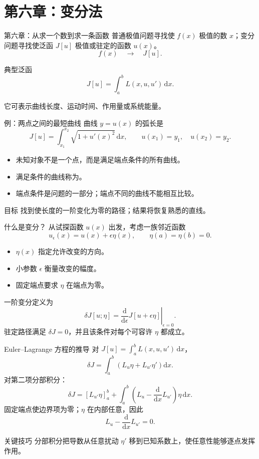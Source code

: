 \section{第六章：变分法}

\begin{frame}{第六章：从求一个数到求一条函数}
  普通极值问题寻找使 $f(x)$ 极值的数 $x$；变分问题寻找使泛函 $J[u]$ 极值或驻定的函数 $u(x)$。
  \[
    f(x)\quad\longrightarrow\quad J[u].
  \]
  \begin{block}{典型泛函}
    \[
      J[u]=\int_a^bL(x,u,u')\,\mathrm{d}x.
    \]
  \end{block}
  它可表示曲线长度、运动时间、作用量或系统能量。
\end{frame}

\begin{frame}{例：两点之间的最短曲线}
  曲线 $y=u(x)$ 的弧长是
  \[
    J[u]=\int_{x_1}^{x_2}\sqrt{1+u'(x)^2}\,\mathrm{d}x,
    \qquad u(x_1)=y_1,\quad u(x_2)=y_2.
  \]
  \begin{itemize}
    \item 未知对象不是一个点，而是满足端点条件的所有曲线。
    \item 满足条件的曲线称为。
    \item 端点条件是问题的一部分；端点不同的曲线不能相互比较。
  \end{itemize}
  \begin{alertblock}{目标}
    找到使长度的一阶变化为零的路径；结果将恢复熟悉的直线。
  \end{alertblock}
\end{frame}

\begin{frame}{什么是变分？}
  从试探函数 $u(x)$ 出发，考虑一族邻近函数
  \[
    u_\epsilon(x)=u(x)+\epsilon\eta(x),
    \qquad \eta(a)=\eta(b)=0.
  \]
  \begin{itemize}
    \item $\eta(x)$ 指定允许改变的方向。
    \item 小参数 $\epsilon$ 衡量改变的幅度。
    \item 固定端点要求 $\eta$ 在端点为零。
  \end{itemize}
  一阶变分定义为
  \[
    \delta J[u;\eta]=
    \left.\frac{\mathrm{d}}{\mathrm{d}\epsilon}J[u+\epsilon\eta]
    \right|_{\epsilon=0}.
  \]
  驻定路径满足 $\delta J=0$，并且该条件对每个可容许 $\eta$ 都成立。
\end{frame}

\begin{frame}{Euler--Lagrange 方程的推导}
  对 $J[u]=\int_a^bL(x,u,u')\,\mathrm{d}x$，
  \[
    \delta J=\int_a^b\left(L_u\eta+L_{u'}\eta'\right)\mathrm{d}x.
  \]
  对第二项分部积分：
  \[
    \delta J=\left[L_{u'}\eta\right]_a^b+
    \int_a^b\left(L_u-\frac{\mathrm{d}}{\mathrm{d}x}L_{u'}\right)\eta\,\mathrm{d}x.
  \]
  固定端点使边界项为零；$\eta$ 在内部任意，因此
  \[
    \boxed{L_u-\frac{\mathrm{d}}{\mathrm{d}x}L_{u'}=0.}
  \]
  \begin{block}{关键技巧}
    分部积分把导数从任意扰动 $\eta'$ 移到已知系数上，使任意性能够逐点发挥作用。
  \end{block}
\end{frame}

